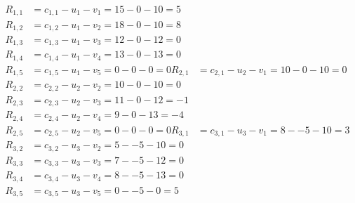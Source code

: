 \[
\begin{aligned}
R_{1,1} &= c_{1,1} - u_{1} - v_{1} = 15 - 0 - 10 = 5 \\
R_{1,2} &= c_{1,2} - u_{1} - v_{2} = 18 - 0 - 10 = 8 \\
R_{1,3} &= c_{1,3} - u_{1} - v_{3} = 12 - 0 - 12 = 0 \\
R_{1,4} &= c_{1,4} - u_{1} - v_{4} = 13 - 0 - 13 = 0 \\
R_{1,5} &= c_{1,5} - u_{1} - v_{5} = 0 - 0 - 0 = 0 
R_{2,1} &= c_{2,1} - u_{2} - v_{1} = 10 - 0 - 10 = 0 \\
R_{2,2} &= c_{2,2} - u_{2} - v_{2} = 10 - 0 - 10 = 0 \\
R_{2,3} &= c_{2,3} - u_{2} - v_{3} = 11 - 0 - 12 = -1 \\
R_{2,4} &= c_{2,4} - u_{2} - v_{4} = 9 - 0 - 13 = -4 \\
R_{2,5} &= c_{2,5} - u_{2} - v_{5} = 0 - 0 - 0 = 0 
R_{3,1} &= c_{3,1} - u_{3} - v_{1} = 8 - -5 - 10 = 3 \\
R_{3,2} &= c_{3,2} - u_{3} - v_{2} = 5 - -5 - 10 = 0 \\
R_{3,3} &= c_{3,3} - u_{3} - v_{3} = 7 - -5 - 12 = 0 \\
R_{3,4} &= c_{3,4} - u_{3} - v_{4} = 8 - -5 - 13 = 0 \\
R_{3,5} &= c_{3,5} - u_{3} - v_{5} = 0 - -5 - 0 = 5 
\end{aligned}
\]

